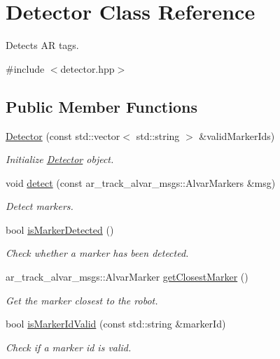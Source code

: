 \hypertarget{classDetector}{}\section{Detector Class Reference}
\label{classDetector}


Detects AR tags.  




{\ttfamily \#include $<$detector.\+hpp$>$}

\subsection*{Public Member Functions}
\begin{DoxyCompactItemize}
\item 
\hyperlink{classDetector_a1d1e06ac51d880ece1d969a95e9e5a32}{Detector} (const std\+::vector$<$ std\+::string $>$ \&valid\+Marker\+Ids)
\begin{DoxyCompactList}\small\item\em Initialize \hyperlink{classDetector}{Detector} object. \end{DoxyCompactList}\item 
void \hyperlink{classDetector_a791c31687afbd137621a546a921b952f}{detect} (const ar\+\_\+track\+\_\+alvar\+\_\+msgs\+::\+Alvar\+Markers \&msg)
\begin{DoxyCompactList}\small\item\em Detect markers. \end{DoxyCompactList}\item 
bool \hyperlink{classDetector_a7e42251ac89d61349dc82568d4f05256}{is\+Marker\+Detected} ()
\begin{DoxyCompactList}\small\item\em Check whether a marker has been detected. \end{DoxyCompactList}\item 
ar\+\_\+track\+\_\+alvar\+\_\+msgs\+::\+Alvar\+Marker \hyperlink{classDetector_aaed77ff14ca621807e84f276bd388b58}{get\+Closest\+Marker} ()
\begin{DoxyCompactList}\small\item\em Get the marker closest to the robot. \end{DoxyCompactList}\item 
bool \hyperlink{classDetector_a47abbf054591d3b8213136892594cf7b}{is\+Marker\+Id\+Valid} (const std\+::string \&marker\+Id)
\begin{DoxyCompactList}\small\item\em Check if a marker id is valid. \end{DoxyCompactList}\end{DoxyCompactItemize}



